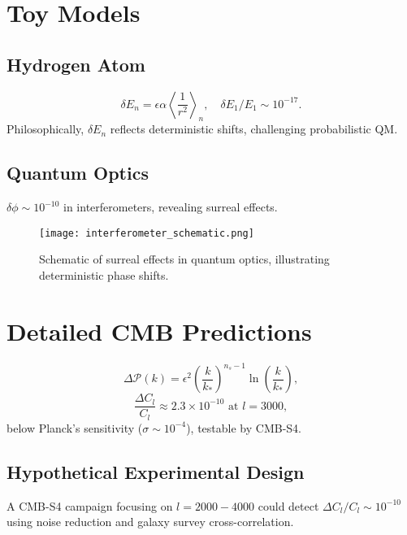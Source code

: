 \documentclass{article}
\begin{document}
\section{Toy Models}
\subsection{Hydrogen Atom}
\begin{equation}
\delta E_n = \epsilon \alpha \left\langle \frac{1}{r^2} \right\rangle_n, \quad \delta E_1 / E_1 \sim 10^{-17}.
\end{equation}
Philosophically, \(\delta E_n\) reflects deterministic shifts, challenging probabilistic QM.

\subsection{Quantum Optics}
\(\delta \phi \sim 10^{-10}\) in interferometers, revealing surreal effects.

\begin{figure}[h]
    \centering
    \texttt{[image: interferometer\_schematic.png]}
    \caption{Schematic of surreal effects in quantum optics, illustrating deterministic phase shifts.}
    \label{fig:interferometer}
\end{figure}

\section{Detailed CMB Predictions}
\begin{equation}
\Delta \mathcal{P}(k) = \epsilon^2 \left( \frac{k}{k_*} \right)^{n_s-1} \ln \left( \frac{k}{k_*} \right),
\end{equation}
\begin{equation}
\frac{\Delta C_l}{C_l} \approx 2.3 \times 10^{-10} \text{ at } l = 3000,
\end{equation}
below Planck's sensitivity (\(\sigma \sim 10^{-4}\)), testable by CMB-S4.

\subsection{Hypothetical Experimental Design}
A CMB-S4 campaign focusing on \(l = 2000-4000\) could detect \(\Delta C_l / C_l \sim 10^{-10}\) using noise reduction and galaxy survey cross-correlation.
\end{document}
